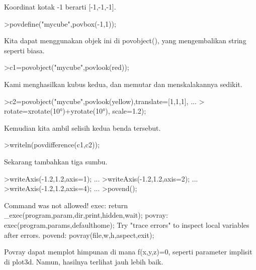\documentclass{article}
\begin{document}
\begin{eulernotebook}
\begin{eulercomment}
\begin{eulercomment}
\begin{eulercomment}
Koordinat kotak -1 berarti [-1,-1,-1].
\end{eulercomment}
\begin{eulerprompt}
>povdefine("mycube",povbox(-1,1));
\end{eulerprompt}
\begin{eulercomment}
Kita dapat menggunakan objek ini di povobject(), yang mengembalikan
string seperti biasa.
\end{eulercomment}
\begin{eulerprompt}
>c1=povobject("mycube",povlook(red));
\end{eulerprompt}
\begin{eulercomment}
Kami menghasilkan kubus kedua, dan memutar dan menskalakannya sedikit.
\end{eulercomment}
\begin{eulerprompt}
>c2=povobject("mycube",povlook(yellow),translate=[1,1,1], ...
>  rotate=xrotate(10°)+yrotate(10°), scale=1.2);
\end{eulerprompt}
\begin{eulercomment}
Kemudian kita ambil selisih kedua benda tersebut.
\end{eulercomment}
\begin{eulerprompt}
>writeln(povdifference(c1,c2));
\end{eulerprompt}
\begin{eulercomment}
Sekarang tambahkan tiga sumbu.
\end{eulercomment}
\begin{eulerprompt}
>writeAxis(-1.2,1.2,axis=1); ...
>writeAxis(-1.2,1.2,axis=2); ...
>writeAxis(-1.2,1.2,axis=4); ...
>povend();
\end{eulerprompt}
\begin{euleroutput}
  Command was not allowed!
  exec:
      return _exec(program,param,dir,print,hidden,wait);
  povray:
      exec(program,params,defaulthome);
  Try "trace errors" to inspect local variables after errors.
  povend:
      povray(file,w,h,aspect,exit); 
\end{euleroutput}
\begin{eulercomment}
Povray dapat memplot himpunan di mana f(x,y,z)=0, seperti parameter
implisit di plot3d. Namun, hasilnya terlihat jauh lebih baik.


\end{eulercomment}
\end{eulercomment}
\end{eulercomment}
\end{eulernotebook}
\end{document}

